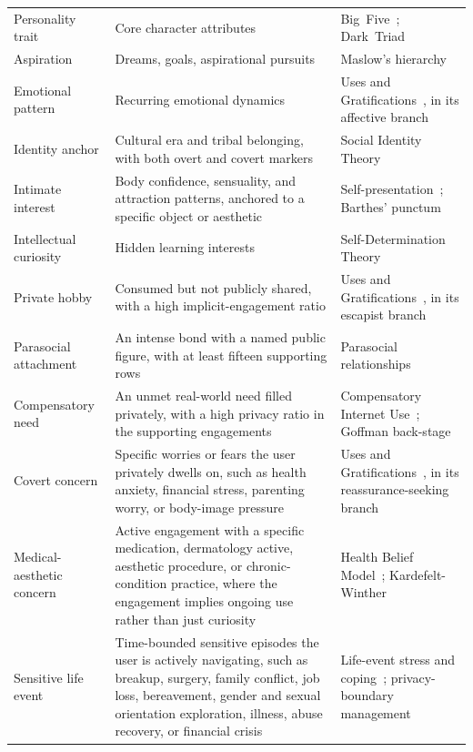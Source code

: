 \documentclass[]{fairmeta}
\begin{document}
{\begin{longtable}{p{}p{}p{}}
  Personality trait & Core character attributes & Big~Five~\citep{mccrae1992introduction}; Dark~Triad~\citep{paulhus2002dark} \\
  Aspiration & Dreams, goals, aspirational pursuits & Maslow's hierarchy~\citep{maslow1943theory} \\
  Emotional pattern & Recurring emotional dynamics & Uses and Gratifications~\citep{katz1973uses}, in its affective branch \\
  Identity anchor & Cultural era and tribal belonging, with both overt and covert markers & Social Identity Theory~\citep{tajfel1979integrative} \\
  Intimate interest & Body confidence, sensuality, and attraction patterns, anchored to a specific object or aesthetic & Self-presentation~\citep{goffman1959presentation}; Barthes' punctum~\citep{barthes1981camera} \\
  Intellectual curiosity & Hidden learning interests & Self-Determination Theory~\citep{deci1985intrinsic} \\
  Private hobby & Consumed but not publicly shared, with a high implicit-engagement ratio & Uses and Gratifications~\citep{katz1973uses}, in its escapist branch \\
  Parasocial attachment & An intense bond with a named public figure, with at least fifteen supporting rows & Parasocial relationships~\citep{horton1956mass} \\
  Compensatory need & An unmet real-world need filled privately, with a high privacy ratio in the supporting engagements & Compensatory Internet Use~\citep{kardefelt2014conceptual}; Goffman back-stage~\citep{goffman1959presentation} \\
  Covert concern & Specific worries or fears the user privately dwells on, such as health anxiety, financial stress, parenting worry, or body-image pressure & Uses and Gratifications~\citep{katz1973uses}, in its reassurance-seeking branch \\
  Medical-aesthetic concern & Active engagement with a specific medication, dermatology active, aesthetic procedure, or chronic-condition practice, where the engagement implies ongoing use rather than just curiosity & Health Belief Model~\citep{rosenstock1974historical}; Kardefelt-Winther~\citep{kardefelt2014conceptual} \\
  Sensitive life event & Time-bounded sensitive episodes the user is actively navigating, such as breakup, surgery, family conflict, job loss, bereavement, gender and sexual orientation exploration, illness, abuse recovery, or financial crisis & Life-event stress and coping~\citep{holmes1967social,lazarus1984stress}; privacy-boundary management~\citep{petronio2002boundaries} \\
\end{longtable}
}
\end{document}
